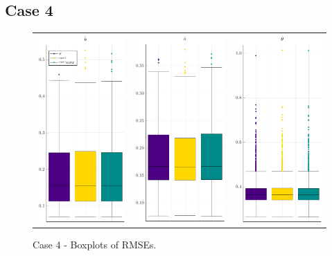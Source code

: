 \subsection{Case 4}
\begin{figure}[H] 
	\centering
	\begin{tabular}[b]{c c c}
		\includegraphics[width=.3\textwidth]{Figures/4/RMSE_b.pdf} & \includegraphics[width=.3\textwidth]{Figures/4/RMSE_a.pdf} & \includegraphics[width=.3\textwidth]{Figures/4/RMSE_t.pdf}
	\end{tabular}
	\caption{Case 4 - Boxplots of RMSEs.}
	\label{fig:bpRMSE4}
\end{figure}

